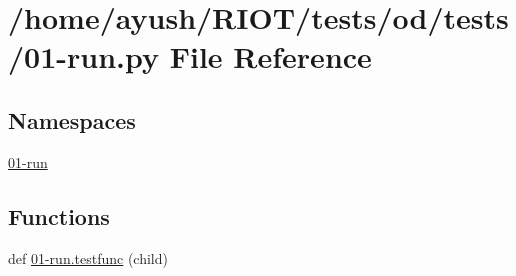 \hypertarget{od_2tests_201-run_8py}{}\section{/home/ayush/\+R\+I\+O\+T/tests/od/tests/01-\/run.py File Reference}
\label{od_2tests_201-run_8py}
\subsection*{Namespaces}
\begin{DoxyCompactItemize}
\item 
 \hyperlink{namespace01-run}{01-\/run}
\end{DoxyCompactItemize}
\subsection*{Functions}
\begin{DoxyCompactItemize}
\item 
def \hyperlink{namespace01-run_aff983ffd4ab0e6bf8e7e58970e4a10bb}{01-\/run.\+testfunc} (child)
\end{DoxyCompactItemize}
